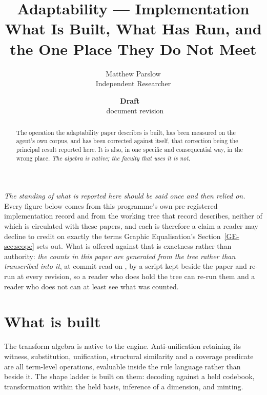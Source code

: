 \documentclass[11pt,a4paper]{article}
\title{Adaptability --- Implementation\\\large What Is Built, What Has Run, and the One Place They Do Not Meet}
\author{Matthew Parslow\\Independent Researcher}
\date{\textbf{Draft \texorpdfstring{\textemdash}{---}\ \PaperDraft}\\[2pt]\PaperDisplayDate \texorpdfstring{\textbullet}{\textperiodcentered}\ document revision \PaperRevision}
\theoremstyle{remark}
\begin{document}
\maketitle
\begin{center}
\end{center}
\vspace{1em}

\begin{abstract}
The operation the adaptability paper describes is built, has been measured on the agent's own corpus,
and has been corrected against itself, that correction being the principal result reported here. It is
also, in one specific and consequential way, in the wrong place. \emph{The algebra is native; the
faculty that uses it is not.}
\end{abstract}

\emph{The standing of what is reported here should be said once and then relied on.} Every figure
below comes from this programme's own pre-registered implementation record and from the working tree
that record describes, neither of which is circulated with these papers, and each is therefore a claim
a reader may decline to credit on exactly the terms Graphic Equalisation's Section~\ref{GE-sec:scope}
sets out. What is offered against that is exactness rather than authority: \emph{the counts in this
paper are generated from the tree rather than transcribed into it}, at commit \countsCommit{} read on
\countsReadOn, by a script kept beside the paper and re-run at every revision, so a reader who does
hold the tree can re-run them and a reader who does not can at least see what was counted.

\section{What is built}\label{sec:built}
The transform algebra is native to the engine. Anti-unification retaining its witness, substitution,
unification, structural similarity and a coverage predicate are all term-level operations, evaluable
inside the rule language rather than beside it. The shape ladder is built on them: decoding against a
held codebook, transformation within the held basis, inference of a dimension, and minting.
\end{document}
